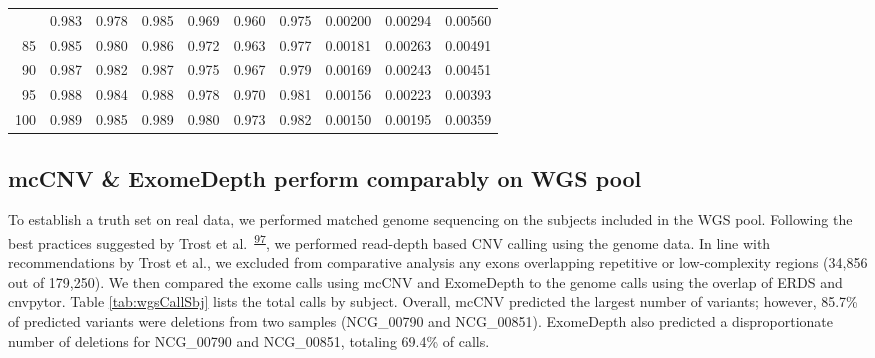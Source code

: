 \documentclass[11pt,letterpaper]{book}
\begin{document}
\begin{table}
\begin{tabular}[t]{rrrrrrrrrr}
\addlinespace
80 & 0.983 & 0.978 & 0.985 & 0.969 & 0.960 & 0.975 & 0.00200 & 0.00294 & 0.00560\\
85 & 0.985 & 0.980 & 0.986 & 0.972 & 0.963 & 0.977 & 0.00181 & 0.00263 & 0.00491\\
90 & 0.987 & 0.982 & 0.987 & 0.975 & 0.967 & 0.979 & 0.00169 & 0.00243 & 0.00451\\
95 & 0.988 & 0.984 & 0.988 & 0.978 & 0.970 & 0.981 & 0.00156 & 0.00223 & 0.00393\\
100 & 0.989 & 0.985 & 0.989 & 0.980 & 0.973 & 0.982 & 0.00150 & 0.00195 & 0.00359\\
\bottomrule
\end{tabular}
\end{table}

\hypertarget{mccnv-exomedepth-perform-comparably-on-wgs-pool}{%
\subsection{mcCNV \& ExomeDepth perform comparably on WGS pool}\label{mccnv-exomedepth-perform-comparably-on-wgs-pool}}

To establish a truth set on real data, we performed matched genome sequencing on the subjects included in the WGS pool.
Following the best practices suggested by Trost et al.~\textsuperscript{\protect\hyperlink{ref-trost:2018aa}{97}}, we performed read-depth based CNV calling using the genome data.
In line with recommendations by Trost et al., we excluded from comparative analysis any exons overlapping repetitive or low-complexity regions (34,856 out of 179,250).
We then compared the exome calls using mcCNV and ExomeDepth to the genome calls using the overlap of ERDS and cnvpytor.
Table \ref{tab:wgsCallSbj} lists the total calls by subject.
Overall, mcCNV predicted the largest number of variants; however, 85.7\% of predicted variants were deletions from two samples (NCG\_00790 and NCG\_00851).
ExomeDepth also predicted a disproportionate number of deletions for NCG\_00790 and NCG\_00851, totaling 69.4\% of calls.
\end{document}
